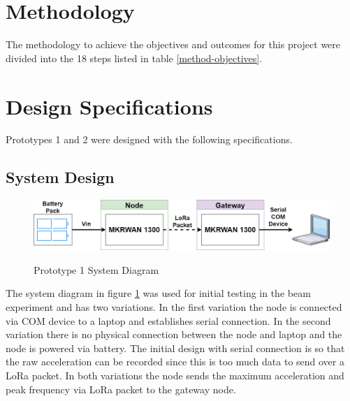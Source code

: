 \section{Methodology}
The methodology to achieve the objectives and outcomes for this project were divided into the 18 steps listed in table  \ref{method-objectives}.
\section{Design Specifications}
Prototypes 1 and 2 were designed with the following specifications. 

\subsection{System Design}

\begin{figure}[h]
	\centering
	\caption{Prototype 1 System Diagram}
	\includegraphics[width=\textwidth]{Sections/Design-Process/proto1-sys-diagram.png}
	\label{proto1-sys-diagram}
\end{figure}

The system diagram in figure \ref{proto1-sys-diagram} was used for initial testing in the beam experiment and has two variations. In the first variation the node is connected via COM device to a laptop and establishes serial connection. In the second variation there is no physical connection between the node and laptop and the node is powered via battery. The initial design with serial connection is so that the raw acceleration can be recorded since this is too much data to send over a LoRa packet. In both variations the node sends the maximum acceleration and peak frequency via LoRa packet to the gateway node. 

